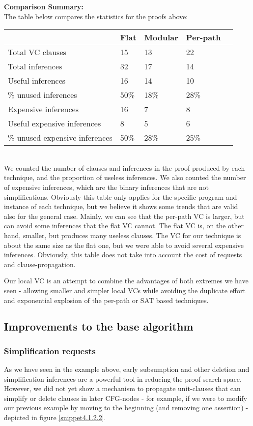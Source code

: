 \textbf{Comparison Summary:}\\
The table below compares the statistics for the proofs above:\\
\begin{tabular}{|l|l|l|l|l|}
\hline
                     & \textbf{Flat} & \textbf{Modular} & \textbf{Per-path}\\
\hline
Total VC clauses     & 15   & 13   & 22\\
\hline
Total inferences     & 32   & 17   & 14\\
\hline
Useful inferences    & 16   & 14   & 10\\
\hline
\% unused inferences & 50\% & 18\% & 28\%\\
\hline
Expensive inferences & 16   & 7   & 8\\
\hline
Useful expensive inferences    & 8   & 5   & 6\\
\hline
\% unused expensive inferences       & 50\% & 28\% & 25\%\\
\hline
\end{tabular}\\
We counted the number of clauses and inferences in the proof produced by each technique, 
and the proportion of useless inferences. 
We also counted the number of expensive inferences, which are the binary inferences that are not simplifications.
Obviously this table only applies for the specific program and instance of each technique, but we believe it shows some trends that are valid also for the general case. Mainly, we can see that the per-path VC is larger, but can avoid some inferences that the flat VC cannot. 
The flat VC is, on the other hand, smaller, but produces many useless clauses. The VC for our technique is about the same size as the flat one, but we were able to avoid several expensive inferences.
Obviously, this table does not take into account the cost of requests and clause-propagation.

Our local VC is an attempt to combine the advantages of both extremes we have seen - allowing smaller and simpler local VCs while avoiding the duplicate effort and exponential explosion of the per-path or SAT based techniques.

\subsection{Improvements to the base algorithm}
\subsubsection*{Simplification requests}
As we have seen in the example above, early subsumption and other deletion and simplification inferences are a powerful tool in reducing the proof search space.\\
However, we did not yet show a mechanism to propagate unit-clauses that can simplify or delete clauses in later CFG-nodes - for example, if we were to modify our previous example by moving  to the beginning (and removing one assertion) - depicted in figure \ref{snippet4.1.2.2}.


